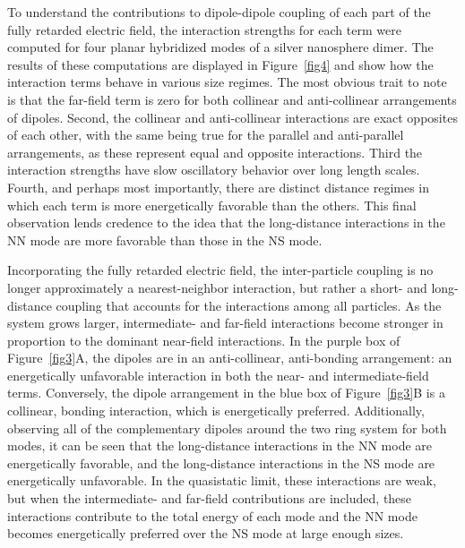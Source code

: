 \documentclass[journal=jpccck,manuscript=article]{achemso}
\begin{document}
To understand the contributions to dipole-dipole coupling of each part of the fully retarded electric field, the interaction strengths for each term were computed for four planar hybridized modes of a silver nanosphere dimer. The results of these computations are displayed in Figure~\ref{fig4} and show how the interaction terms behave in various size regimes. The most obvious trait to note is that the far-field term is zero for both collinear and anti-collinear arrangements of dipoles. Second, the collinear and anti-collinear interactions are exact opposites of each other, with the same being true for the parallel and anti-parallel arrangements, as these represent equal and opposite interactions. Third the interaction strengths have slow oscillatory behavior over long length scales. Fourth, and perhaps most importantly, there are distinct distance regimes in which each term is more energetically favorable than the others. This final observation lends credence to the idea that the long-distance interactions in the NN mode are more favorable than those in the NS mode.

Incorporating the fully retarded electric field, the inter-particle coupling is no longer approximately a nearest-neighbor interaction, but rather a short- and long-distance coupling that accounts for the interactions among all particles. As the system grows larger, intermediate- and far-field interactions become stronger in proportion to the dominant near-field interactions. In the purple box of Figure~\ref{fig3}A, the dipoles are in an anti-collinear, anti-bonding arrangement: an energetically unfavorable interaction in both the near- and intermediate-field terms. Conversely, the dipole arrangement in the blue box of Figure~\ref{fig3}B is a collinear, bonding interaction, which is energetically preferred. Additionally, observing all of the complementary dipoles around the two ring system for both modes, it can be seen that the long-distance interactions in the NN mode are energetically favorable, and the long-distance interactions in the NS mode are energetically unfavorable. In the quasistatic limit, these interactions are weak, but when the intermediate- and far-field contributions are included, these interactions contribute to the total energy of each mode and the NN mode becomes energetically preferred over the NS mode at large enough sizes.
\end{document}
